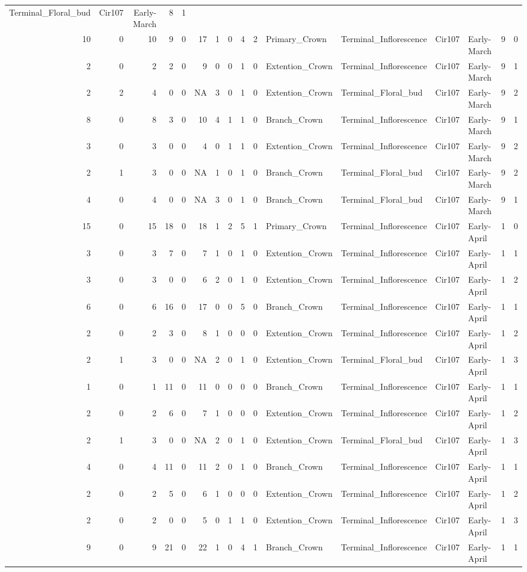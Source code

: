 \documentclass[]{article}
\begin{document}
\begin{longtable}[]{@{}rrrrrrrrrrllllrl@{}}
Terminal\_Floral\_bud & Cir107 & Early-March & 8 & 1\tabularnewline
10 & 0 & 10 & 9 & 0 & 17 & 1 & 0 & 4 & 2 & Primary\_Crown &
Terminal\_Inflorescence & Cir107 & Early-March & 9 & 0\tabularnewline
2 & 0 & 2 & 2 & 0 & 9 & 0 & 0 & 1 & 0 & Extention\_Crown &
Terminal\_Inflorescence & Cir107 & Early-March & 9 & 1\tabularnewline
2 & 2 & 4 & 0 & 0 & NA & 3 & 0 & 1 & 0 & Extention\_Crown &
Terminal\_Floral\_bud & Cir107 & Early-March & 9 & 2\tabularnewline
8 & 0 & 8 & 3 & 0 & 10 & 4 & 1 & 1 & 0 & Branch\_Crown &
Terminal\_Inflorescence & Cir107 & Early-March & 9 & 1\tabularnewline
3 & 0 & 3 & 0 & 0 & 4 & 0 & 1 & 1 & 0 & Extention\_Crown &
Terminal\_Inflorescence & Cir107 & Early-March & 9 & 2\tabularnewline
2 & 1 & 3 & 0 & 0 & NA & 1 & 0 & 1 & 0 & Branch\_Crown &
Terminal\_Floral\_bud & Cir107 & Early-March & 9 & 2\tabularnewline
4 & 0 & 4 & 0 & 0 & NA & 3 & 0 & 1 & 0 & Branch\_Crown &
Terminal\_Floral\_bud & Cir107 & Early-March & 9 & 1\tabularnewline
15 & 0 & 15 & 18 & 0 & 18 & 1 & 2 & 5 & 1 & Primary\_Crown &
Terminal\_Inflorescence & Cir107 & Early-April & 1 & 0\tabularnewline
3 & 0 & 3 & 7 & 0 & 7 & 1 & 0 & 1 & 0 & Extention\_Crown &
Terminal\_Inflorescence & Cir107 & Early-April & 1 & 1\tabularnewline
3 & 0 & 3 & 0 & 0 & 6 & 2 & 0 & 1 & 0 & Extention\_Crown &
Terminal\_Inflorescence & Cir107 & Early-April & 1 & 2\tabularnewline
6 & 0 & 6 & 16 & 0 & 17 & 0 & 0 & 5 & 0 & Branch\_Crown &
Terminal\_Inflorescence & Cir107 & Early-April & 1 & 1\tabularnewline
2 & 0 & 2 & 3 & 0 & 8 & 1 & 0 & 0 & 0 & Extention\_Crown &
Terminal\_Inflorescence & Cir107 & Early-April & 1 & 2\tabularnewline
2 & 1 & 3 & 0 & 0 & NA & 2 & 0 & 1 & 0 & Extention\_Crown &
Terminal\_Floral\_bud & Cir107 & Early-April & 1 & 3\tabularnewline
1 & 0 & 1 & 11 & 0 & 11 & 0 & 0 & 0 & 0 & Branch\_Crown &
Terminal\_Inflorescence & Cir107 & Early-April & 1 & 1\tabularnewline
2 & 0 & 2 & 6 & 0 & 7 & 1 & 0 & 0 & 0 & Extention\_Crown &
Terminal\_Inflorescence & Cir107 & Early-April & 1 & 2\tabularnewline
2 & 1 & 3 & 0 & 0 & NA & 2 & 0 & 1 & 0 & Extention\_Crown &
Terminal\_Floral\_bud & Cir107 & Early-April & 1 & 3\tabularnewline
4 & 0 & 4 & 11 & 0 & 11 & 2 & 0 & 1 & 0 & Branch\_Crown &
Terminal\_Inflorescence & Cir107 & Early-April & 1 & 1\tabularnewline
2 & 0 & 2 & 5 & 0 & 6 & 1 & 0 & 0 & 0 & Extention\_Crown &
Terminal\_Inflorescence & Cir107 & Early-April & 1 & 2\tabularnewline
2 & 0 & 2 & 0 & 0 & 5 & 0 & 1 & 1 & 0 & Extention\_Crown &
Terminal\_Inflorescence & Cir107 & Early-April & 1 & 3\tabularnewline
9 & 0 & 9 & 21 & 0 & 22 & 1 & 0 & 4 & 1 & Branch\_Crown &
Terminal\_Inflorescence & Cir107 & Early-April & 1 & 1\tabularnewline

\end{longtable}
\end{document}
